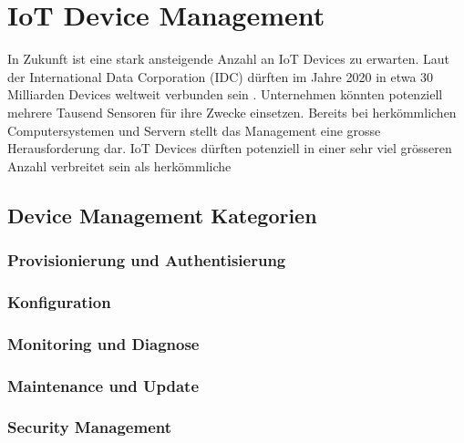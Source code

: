 \chapter{IoT Device Management}
In Zukunft ist eine stark ansteigende Anzahl an IoT Devices zu erwarten. Laut der International Data Corporation (IDC) dürften im Jahre 2020 in etwa 30 Milliarden Devices weltweit verbunden sein \cite{IDC15}. Unternehmen könnten potenziell mehrere Tausend Sensoren für ihre Zwecke einsetzen. Bereits bei herkömmlichen Computersystemen und Servern stellt das Management eine grosse Herausforderung dar. IoT Devices dürften potenziell in einer sehr viel grösseren Anzahl verbreitet sein als herkömmliche 
\section{Device Management Kategorien}

\subsection{Provisionierung und Authentisierung}
\subsection{Konfiguration}
\subsection{Monitoring und Diagnose}
\subsection{Maintenance und Update}
\subsection{Security Management}

\section{}




















